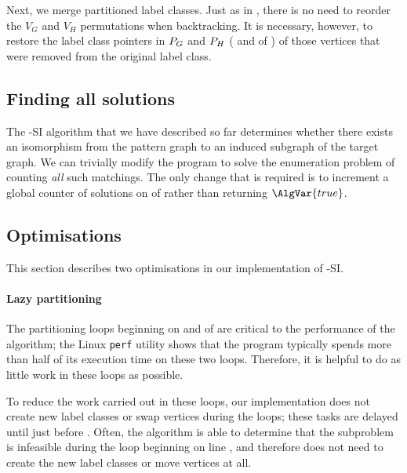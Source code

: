 Next, we merge partitioned label classes.  Just as in \McSplit, there is
no need to reorder the $V_G$ and $V_H$ permutations when backtracking.
It is necessary, however, to restore the label class pointers in $P_G$
and $P_H$ ( and 
of ) of those vertices that were removed from
the original label class.

\FloatBarrier

\subsection{Finding all solutions}

The \McSplit-SI algorithm that we have described so far determines whether there
exists an isomorphism from the pattern graph to an induced subgraph of the target
graph.  We can trivially modify the program to solve the enumeration problem
of counting \emph{all} such matchings.  The only change that is required is
to increment a global counter of solutions on
 of  rather than returning
$\AlgVar{true}$.

\subsection{Optimisations}\label{subsec:mcsplit-si-optimisations}

This section describes two optimisations in our implementation of \McSplit-SI.

\paragraph{Lazy partitioning}
The partitioning loops beginning on 
and  of  are critical to
the performance of the algorithm; the Linux \texttt{perf} utility shows
that the program typically spends more than half of its execution time
on these two loops.  Therefore, it is helpful to do as little work in these
loops as possible.

To reduce the work carried out in these loops, our implementation does
not create new label classes or swap vertices during the loops; these
tasks are delayed until just before .
Often, the algorithm is able to determine that the subproblem
is infeasible during the loop beginning on line
, and therefore does
not need to create the new label classes or move vertices at all.

